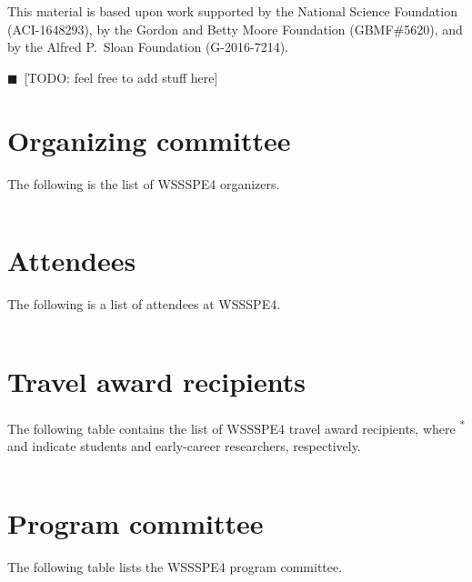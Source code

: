 \documentclass[11pt, oneside]{amsart}
\newcommand{\todo}[1]{{\color{blue}$\blacksquare$~\textsf{[TODO: #1]}}}
\begin{document}
This material is based upon work supported by the National Science Foundation (ACI-1648293),
by the Gordon and Betty Moore Foundation (GBMF\#5620),
and by the Alfred P.~Sloan Foundation (G-2016-7214).

\todo{feel free to add stuff here}

\newpage
\appendix
\section{Organizing committee}  \label{sec:orgcom}

The following is the list of WSSSPE4 organizers.

{\scriptsize
\begin{longtable}{lll}

\end{longtable}
}


\section{Attendees}  \label{sec:attendees}
The following is a list of attendees at WSSSPE4.

{\scriptsize
\begin{longtable}{lll}

\end{longtable}
}

\section{Travel award recipients}  \label{sec:awardees}
The following table contains the list of WSSSPE4 travel award recipients, where
\textsuperscript{*} and \textsuperscript{\textdagger} indicate students and
early-career researchers, respectively.

{\scriptsize
\begin{longtable}{lll}

\end{longtable}
}

\section{Program committee}  \label{sec:progcom}
The following table lists the WSSSPE4 program committee.
\end{document}
